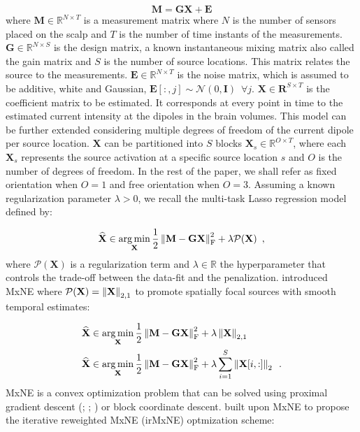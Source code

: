 \begin{equation} \label{eq:1}
    \mathbf{M = GX + E}
\end{equation}
%
where $\mathbf{M} \in \mathbb{R}^{N \times T}$ is a measurement matrix where $N$ is the
number of sensors placed on the scalp and $T$ is the number of time instants of the measurements.
$\mathbf{G} \in \mathbb{R}^{N \times S}$ is the design matrix, a known 
instantaneous mixing matrix also called the gain matrix and $S$ is the number of source locations.
This matrix relates the source
to the measurements. $\mathbf{E} \in \mathbb{R}^{N \times T}$ is the noise matrix, which
is assumed to be additive, white and Gaussian, $\mathbf{E}[:,j] \sim \mathcal{N}(0, \mathbf{I})
\enspace \forall j$. $\mathbf{X} \in \mathbf{R}^{S \times T}$ is the coefficient matrix to be estimated. 
It corresponds at every point in time to the estimated current intensity at the dipoles in
the brain volumes. This model can be further extended considering multiple degrees of freedom of the current dipole
per source location. $\mathbf{X}$ can be partitioned into $S$ blocks $\mathbf{X}_s \in \mathbb{R}^{O \times T}$, where
each $\mathbf{X}_s$ represents the source activation at a specific source location $s$ and $O$ is the number of 
degrees of freedom. In the rest of the paper, we shall refer as fixed orientation when $O = 1$ and
free orientation when $O = 3$. Assuming a known regularization parameter $\lambda > 0$, we recall the multi-task
Lasso regression model defined by:

\begin{equation} \label{eq:2}
    \widehat{\mathbf{X}} \in \operatorname*{arg\,min}_{\mathbf{X}}
    \frac{1}{2}\left \lVert \mathbf{M - GX} \right \rVert^2_{\text{F}}
    + \lambda \mathcal{P}(\mathbf{X})
    \enspace ,
\end{equation}
%
where $\mathcal{P}(\mathbf{X})$ is a regularization term and $\lambda \in \mathbb{R}$ the hyperparameter
that controls the trade-off between the data-fit and the penalization. \cite{Gramfort_Kowalski_Hamalainen12}
introduced MxNE where $\mathcal{P}(\mathbf{X}) = \left \lVert \mathbf{X} \right \rVert_{2, 1}$ to promote spatially focal sources with
smooth temporal estimates:

\begin{align} \label{eq:3}
    \widehat{\mathbf{X}} 
    &\in 
    \operatorname*{arg\,min}_{\mathbf{X}}
    \frac{1}{2}\left \lVert \mathbf{M - GX} \right \rVert^2_{\text{F}}
    + \lambda \left \lVert \mathbf{X} \right \rVert_{2, 1}
    \\
    \widehat{\mathbf{X}} 
    &\in
    \operatorname*{arg\,min}_{\mathbf{X}}
    \frac{1}{2}\left \lVert \mathbf{M - GX} \right \rVert^2_{\text{F}}
    + \lambda \sum_{i=1}^{S} \left \lVert \mathbf{X}[i,:] \right \rVert_2
    \enspace .
\end{align}
%
MxNE is a convex optimization problem that can be solved using proximal gradient descent (\cite{Nesterov05}; \cite{Nesterov09}; \cite{Beck_Teboulle09})
or block coordinate descent. \cite{Strohmeier_Bekhti_Haueisen_Gramfort_2016} built upon MxNE to propose the iterative reweighted MxNE (irMxNE) optmization
scheme:

